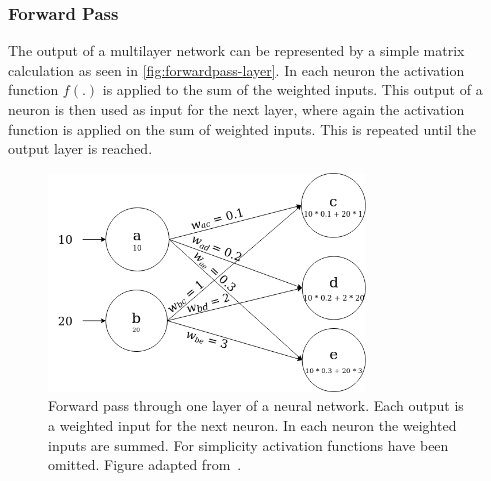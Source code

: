 \subsubsection{Forward Pass}
The output of a multilayer network can be represented by a simple matrix calculation as seen in \autoref{fig:forwardpass-layer}.
In each neuron the activation function $f(.)$ is applied to the sum of the weighted inputs.
This output of a neuron is then used as input for the next layer, where again the activation function is applied on the sum of weighted inputs.
This is repeated until the output layer is reached.

\begin{figure}[htb]
    \centering
    \includegraphics[width=0.75\textwidth]{pictures/forwardpass_1layer}
    \caption[Forward pass through neural network]{
    Forward pass through one layer of a neural network. Each output is a weighted input for the next neuron. In each neuron the weighted inputs are summed. For simplicity activation functions have been omitted. Figure adapted from~\autocite[Chapter~4.2]{Skansi2018}.}
    \label{fig:forwardpass-layer}
\end{figure}

